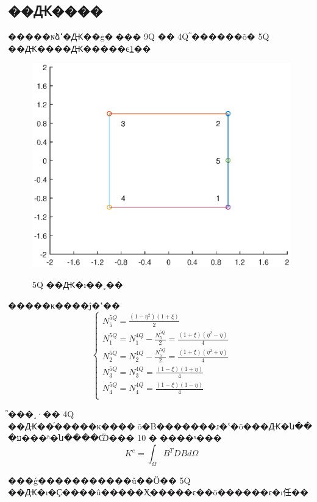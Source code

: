\subsection{��Ԫ����}
    �����ɴձߵ�Ԫ��ģ�͹��� 9Q �� 4Q ֮������õ� 5Q ��Ԫ����Ԫ�����ͼ\ref{5Q}��
    \begin{figure}[h]
        \centering
        \includegraphics[width=.6\textwidth]{./elements/fig/5Q.eps}
        \label{5Q}
        \caption{5Q ��Ԫ�ı��˳��}
    \end{figure}
    
    �����κ����ĵ�ʽ��
    $$
    \begin{cases}
        N_{5}^{5Q}=\frac{\left( 1-\eta ^2 \right) \left( 1+\xi \right)}{2}\\
        N_{1}^{5Q}=N_{1}^{4Q}-\frac{N_{5}^{5Q}}{2}=\frac{\left( 1+\xi \right) \left( \eta ^2-\eta \right)}{4}\\
        N_{2}^{5Q}=N_{2}^{4Q}-\frac{N_{5}^{5Q}}{2}=\frac{\left( 1+\xi \right) \left( \eta ^2+\eta \right)}{4}\\
        N_{3}^{5Q}=N_{3}^{4Q}=\frac{\left( 1-\xi \right) \left( 1+\eta \right)}{4}\\
        N_{4}^{5Q}=N_{4}^{4Q}=\frac{\left( 1-\xi \right) \left( 1-\eta \right)}{4}\\
    \end{cases}
    $$

    ֮���˼·�� 4Q ��Ԫ��ͬ�����κ����󵼵õ�B�������ɹ�ʽ�õ���Ԫ�ն���ע���ʱ�ն����Ѿ��� 10 �׾����ˣ���
    $$
    K^e=\int_{\varOmega}{B^TDBd\varOmega}
    $$

    ���ǵ�����������û��Ӧ�� 5Q ��Ԫ�ı�Ҫ����û�����Ӿֲ�����ϵ��ȫ������ϵ�ı任��
